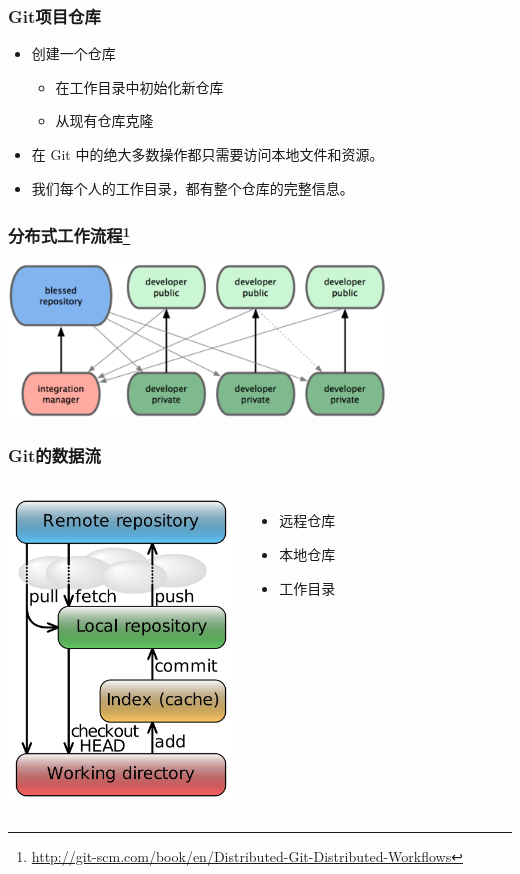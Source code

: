 \begin{frame}
    \frametitle{Git项目仓库}
    \begin{itemize}    
        \item 创建一个仓库
            \begin{itemize}
                \item 在工作目录中初始化新仓库
                \item 从现有仓库克隆
            \end{itemize}
        \item 在 Git 中的绝大多数操作都只需要访问本地文件和资源。
        \item 我们每个人的工作目录，都有整个仓库的完整信息。
    \end{itemize}
\end{frame}

\begin{frame}
    \frametitle{分布式工作流程\footnote{\url{http://git-scm.com/book/en/Distributed-Git-Distributed-Workflows}}}
    \includegraphics[width=10cm,keepaspectratio]{data/GitDistributedWorkflow.png}
\end{frame}

\begin{frame}
    \frametitle{Git的数据流}
    \begin{columns}
        \column{6.0cm}
            \includegraphics[height=8cm,keepaspectratio]{data/GitDataFlowSimplified.png}
            \label{pic:DataFlow}
        \column{4.5cm}
            \begin{itemize}
                \item 远程仓库
                \item 本地仓库
                \item 工作目录
            \end{itemize}
    \end{columns}
\end{frame}

